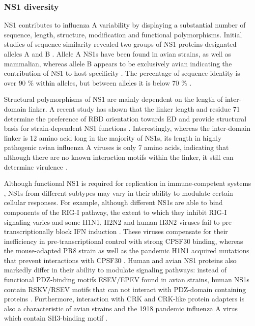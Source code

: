 		
		
		\subsubsection{NS1 diversity}
		
		NS1 contributes to influenza A variability by displaying a substantial number of sequence, length, structure, modification and functional polymorphisms. Initial studies of sequence similarity revealed two groups of \gls{NS1} proteins designated alleles A and B \parencite{Scholtissek1980}. Allele A \gls{NS1}s have been found in avian strains, as well as mammalian, whereas allele B appears to be exclusively avian indicating the contribution of NS1 to host-specificity \parencite{Treanor1989, Ludwig1991}. The percentage of sequence identity is over 90 \% within alleles, but between alleles it is below 70 \% \parencite{Scholtissek1980}.
		
		Structural polymorphisms of \gls{NS1} are mainly dependent on the length of inter-domain linker. A recent study has shown that the linker length and residue 71 determine the preference of \gls{RBD} orientation towards \gls{ED} and provide structural basis for strain-dependent \gls{NS1} functions \parencite{Carrillo2014}. Interestingly, whereas the inter-domain linker is 12 amino acid long in the majority of \gls{NS1}s, its length in highly pathogenic avian influenza A viruses is only 7 amino acids, indicating that although there are no known interaction motifs within the linker, it still can determine virulence \parencite{Long2008}.
		
		Although functional \gls{NS1} is required for replication in immune-competent systems \parencite{Garcia-Sastre1998, Donelan2003}, \gls{NS1}s from different subtypes may vary in their ability to modulate certain cellular responses. For example, although different \gls{NS1}s are able to bind components of the \gls{RIG-I} pathway, the extent to which they inhibit \gls{RIG-I} signaling varies and some H1N1, H2N2 and human H3N2 viruses fail to pre-transcriptionally block \gls{IFN} induction \parencite{Kochs2007, Haye2009, Munir2011a, Munir2012}. These viruses compensate for their inefficiency in pre-transcriptional control with strong \gls{CPSF}30 binding, whereas the mouse-adapted PR8 strain as well as the pandemic H1N1 acquired mutations that prevent interactions with \gls{CPSF}30 \parencite{Kochs2007, Hale2010d}. Human and avian \gls{NS1} proteins also markedly differ in their ability to modulate signaling pathways: instead of functional PDZ-binding motifs ESEV/EPEV found in avian strains, human NS1s contain RSKV/RSEV motifs that can not interact with PDZ-domain containing proteins \parencite{Liu2010}. Furthermore, interaction with CRK and CRK-like protein adapters is also a characteristic of avian strains and the 1918 pandemic influenza A virus which contain SH3-binding motif \parencite{Heikkinen2008}.
		
